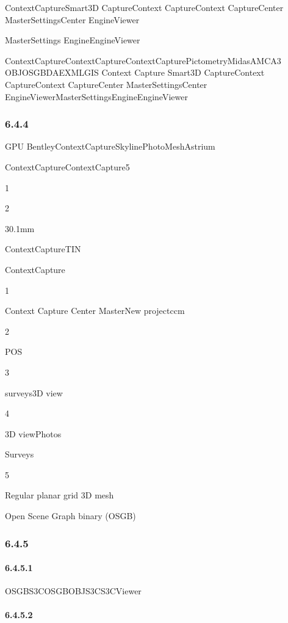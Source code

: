 ContextCaptureSmart3D CaptureContext CaptureContext CaptureCenter
MasterSettingsCenter EngineViewer

MasterSettings EngineEngineViewer

ContextCaptureContextCaptureContextCapturePictometryMidasAMCA3
OBJOSGBDAEXMLGIS Context Capture Smart3D CaptureContext CaptureContext
CaptureCenter MasterSettingsCenter
EngineViewerMasterSettingsEngineEngineViewer

\hypertarget{section-98}{%
\subsubsection{6.4.4}\label{section-98}}

GPU BentleyContextCaptureSkylinePhotoMeshAstrium

ContextCaptureContextCapture5

1

2

30.1mm

ContextCaptureTIN

ContextCapture

1

Context Capture Center MasterNew projectccm

2

POS

3

surveys3D view

4

3D viewPhotos

Surveys

5

Regular planar grid 3D mesh

Open Scene Graph binary (OSGB)

\hypertarget{section-99}{%
\subsubsection{6.4.5}\label{section-99}}

\hypertarget{section-100}{%
\paragraph{6.4.5.1}\label{section-100}}

OSGBS3COSGBOBJS3CS3CViewer

\hypertarget{section-101}{%
\paragraph{6.4.5.2}\label{section-101}}

